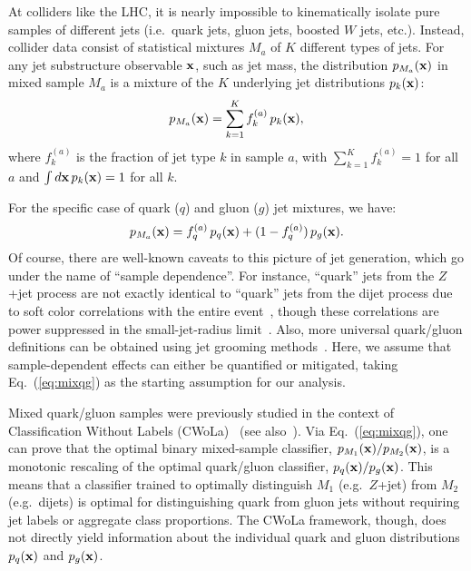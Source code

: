 \documentclass[aps,prl,floatfix,preprintnumbers,twocolumn,groupedaddress,nofootinbib,longbibliography]{revtex4-1}
\DeclareRobustCommand{\Eq}[1]{Eq.~(\ref{#1})}
\begin{document}
At colliders like the LHC, it is nearly impossible to kinematically isolate pure samples of different jets (i.e.\ quark jets, gluon jets, boosted $W$ jets, etc.).
%
Instead, collider data consist of statistical mixtures $M_a$ of $K$ different types of jets.
%
For any jet substructure observable ${\bf x}$, such as jet mass, the distribution $p_{M_a}({\bf x})$ in mixed sample $M_a$ is a mixture of the $K$ underlying jet distributions $p_k({\bf x})$:
\begin{equation}\label{eq:mixtures}
p_{M_a}({\bf x}) = \sum_{k=1}^K f_k^{(a)} \, p_k({\bf x}),
\end{equation}
where $f_k^{(a)}$ is the fraction of jet type $k$ in sample $a$, with $\sum_{k=1}^K f_k^{(a)} = 1$ for all $a$ and $\int d {\bf x} \, p_k({\bf x}) = 1$ for all $k$.

For the specific case of quark ($q$) and gluon ($g$) jet mixtures, we have:
%
\begin{equation}
\label{eq:mixqg}
p_{M_a}({\bf x}) = f_q^{(a)} \, p_q({\bf x}) + (1 - f_q^{(a)})\, p_g({\bf x}).
\end{equation}
%
Of course, there are well-known caveats to this picture of jet generation, which go under the name of ``sample dependence''.
%
For instance, ``quark'' jets from the $Z$+jet process are not exactly identical to ``quark'' jets from the dijet process due to soft color correlations with the entire event~\cite{Gras:2017jty}, though these correlations are power suppressed in the small-jet-radius limit~\cite{Banfi:2010pa,Becher:2016mmh,Kolodrubetz:2016dzb}.
%
Also, more universal quark/gluon definitions can be obtained using jet grooming methods~\cite{Ellis:2009su,Ellis:2009me,Krohn:2009th,Dasgupta:2013ihk,Larkoski:2014wba,Frye:2016okc,Frye:2016aiz,Marzani:2017mva,Marzani:2017kqd}.
%
Here, we assume that sample-dependent effects can either be quantified or mitigated, taking \Eq{eq:mixqg} as the starting assumption for our analysis. 



Mixed quark/gluon samples were previously studied in the context of Classification Without Labels (CWoLa)~\cite{Metodiev:2017vrx} (see also~\cite{Cranmer:2015bka,blanchard2016classification,Dery:2017fap,Cohen:2017exh,Komiske:2018oaa}).
%
Via \Eq{eq:mixqg}, one can prove that the optimal binary mixed-sample classifier, $p_{M_1}({\bf x})/p_{M_2}({\bf x})$, is a monotonic rescaling of the optimal quark/gluon classifier, $p_q({\bf x})/p_g({\bf x})$.
%
This means that a classifier trained to optimally distinguish $M_1$ (e.g.\ $Z$+jet) from $M_2$ (e.g.\ dijets) is optimal for distinguishing quark from gluon jets without requiring jet labels or aggregate class proportions.
%
The CWoLa framework, though, does not directly yield information about the individual quark and gluon distributions $p_q({\bf x})$ and $p_g({\bf x})$.
\end{document}
